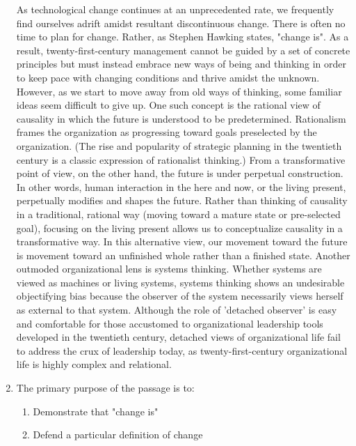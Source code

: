 \documentclass[12pt]{article}
\begin{document}
\begin{enumerate}[label=\textbf{\arabic*.}]
As technological change continues at an unprecedented rate, we frequently find ourselves adrift amidst resultant discontinuous change. There is often no time to plan for change. Rather, as Stephen Hawking states, "change is". As a result, twenty-first-century management cannot be guided by a set of concrete principles but must instead embrace new ways of being and thinking in order to keep pace with changing conditions and thrive amidst the unknown. However, as we start to move away from old ways of thinking, some familiar ideas seem difficult to give up. One such concept is the rational view of causality in which the future is understood to be predetermined. Rationalism frames the organization as progressing toward goals preselected by the organization. (The rise and popularity of strategic planning in the twentieth century is a classic expression of rationalist thinking.) From a transformative point of view, on the other hand, the future is under perpetual construction. In other words, human interaction in the here and now, or the living present, perpetually modifies and shapes the future. Rather than thinking of causality in a traditional, rational way (moving toward a mature state or pre-selected goal), focusing on the living present allows us to conceptualize causality in a transformative way. In this alternative view, our movement toward the future is movement toward an unfinished whole rather than a finished state. Another outmoded organizational lens is systems thinking. Whether systems are viewed as machines or living systems, systems thinking shows an undesirable objectifying bias because the observer of the system necessarily views herself as external to that system. Although the role of 'detached observer' is easy and comfortable for those accustomed to organizational leadership tools developed in the twentieth century, detached views of organizational life fail to address the crux of leadership today, as twenty-first-century organizational life is highly complex and relational.

\item The primary purpose of the passage is to:

\begin{multicols}{2}

\begin{enumerate}[label=(\Alph*)]

\item Demonstrate that "change is"

\item Defend a particular definition of change


\end{enumerate}
\end{multicols}
\end{enumerate}
\end{document}
